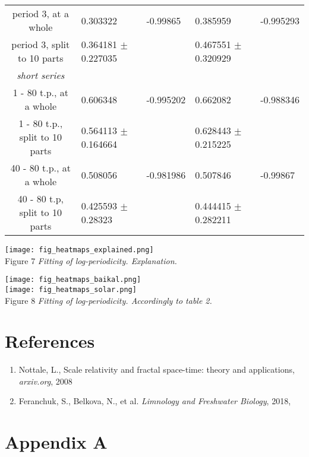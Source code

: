 \documentclass[a4paper]{article}
\begin{document}
\begin{tabular}{cllll}
period 3, at a whole           & 0.303322                 & -0.99865    & 0.385959                 & -0.995293   \\
period 3, split to 10 parts    & 0.364181 $\pm$ 0.227035  &             & 0.467551 $\pm$ 0.320929  &             \\
\textit{short series}\\
1 - 80 t.p., at a whole        & 0.606348                 & -0.995202   & 0.662082                 & -0.988346   \\
1 - 80 t.p., split to 10 parts & 0.564113 $\pm$ 0.164664  &             & 0.628443 $\pm$ 0.215225  &             \\
40 - 80 t.p., at a whole       & 0.508056                 & -0.981986   & 0.507846                 & -0.99867   \\
40 - 80 t.p, split to 10 parts & 0.425593 $\pm$ 0.28323   &             & 0.444415 $\pm$ 0.282211  &             \\
\hline
\end{tabular}

\newpage

\texttt{[image: fig\_heatmaps\_explained.png]}\\
Figure 7 \textit{Fitting of log-periodicity. Explanation.}

\newpage
\texttt{[image: fig\_heatmaps\_baikal.png]}\\
\texttt{[image: fig\_heatmaps\_solar.png]}\\
Figure 8 \textit{Fitting of log-periodicity. Accordingly to table 2.}


\section*{References}

\begin{enumerate}

\item Nottale, L., Scale relativity and fractal space-time: theory and applications, \textit{arxiv.org}, 2008

\item Feranchuk, S., Belkova, N., et al. \textit{Limnology and Freshwater Biology}, 2018,

\end{enumerate}

\newpage
\section*{Appendix A}
\end{document}
